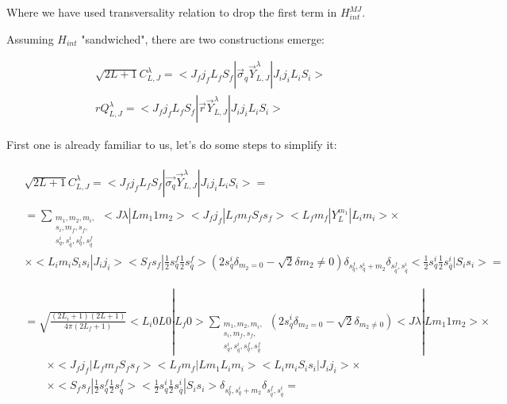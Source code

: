 Where we have used transversality relation to drop the first term in $H_{int}^{MJ}$.

Assuming $H_{int}$ "sandwiched", there are two constructions emerge:

\begin{align}
    &\sqrt{2L+1} C_{L, J}^\lambda = <J_f j_f L_f S_f|\vec{\sigma}_{q} \vec{Y}^{\lambda}_{L, J}|J_i j_i L_i S_i> \\
    &r Q_{L, J}^\lambda = <J_f j_f L_f S_f|\vec{r} \vec{Y}^{\lambda}_{L, J}|J_i j_i L_i S_i>
\end{align}

First one is already familiar to us, let's do some steps to simplify it:

\begin{align} \label{app:hint-mult:Ccoef-reduce}
    \begin{split}
        &\sqrt{2L+1} C_{L, J}^\lambda = <J_f j_f L_f S_f| \vec{\sigma_q} \vec{Y}_{L, J}^\lambda |J_i j_i L_i S_i> =
    \end{split} \\
    \begin{split}
        &= \sum_{\substack{m_1, m_2, m_i,\\ s_i, m_f, s_f,\\ s^i_{q}, s^{i}_{\overline{q}}, s^{f}_{q}, s^{f}_{\overline{q}}}} <J \lambda| L m_1 1 m_2> <J_f j_f| L_f m_f S_f s_f> <L_f m_f| Y_{L}^{m_1} |L_i m_i> \times \\
        &\times <L_i m_i S_i s_i| J_i j_i> <S_f s_f| \frac{1}{2} s^f_{q} \frac{1}{2} s^f_{\overline{q}}> (2 s_q^i \delta_{m_2 = 0} - \sqrt{2}\delta{m_2 \neq 0}) \delta_{s^f_{q}, s^{i}_{q} + m_2} \delta_{s^f_{\overline{q}}, s^i_{\overline{q}}} <\frac{1}{2} s^i_{q} \frac{1}{2} s^i_{\overline{q}} |S_i s_i> = \\
    \end{split} \\
    \begin{split}
        &= \sqrt{\frac{(2L_i + 1)(2L+1)}{4 \pi (2L_f + 1)}} <L_i 0 L 0 | L_f 0> \sum_{\substack{m_1, m_2, m_i,\\ s_i, m_f, s_f,\\ s^i_{q}, s^{i}_{\overline{q}}, s^{f}_{q}, s^{f}_{\overline{q}}}} (2 s_q^i \delta_{m_2 = 0} - \sqrt{2} \delta_{m_2 \neq 0}) <J \lambda| L m_1 1 m_2> \times\\
        &\qquad\times <J_f j_f| L_f m_f S_f s_f> <L_f m_f| L m_1 L_i m_i>  <L_i m_i S_i s_i| J_i j_i> \times\\
        &\qquad\times <S_f s_f| \frac{1}{2} s^f_{q} \frac{1}{2} s^f_{\overline{q}}> <\frac{1}{2} s^i_{q} \frac{1}{2} s^i_{\overline{q}} |S_i s_i> \delta_{s^f_{q}, s^{i}_{q} + m_2} \delta_{s^f_{\overline{q}}, s^i_{\overline{q}}} =

\end{split}
\end{align}
